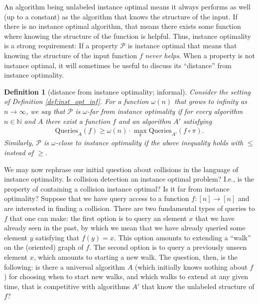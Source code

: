 \documentclass[11pt]{article}
\numberwithin{equation}{section}
\newtheorem{definition}[definition]{Definition}
\newcommand{\N}{\mathbb N}
\renewcommand{\P}{\mathcal{P}}
\newcommand{\1}{\mathbf{1}}
\begin{document}
An algorithm being unlabeled instance optimal means it always performs as well (up to a constant) as the algorithm that knows the structure of the input. If there is no instance optimal algorithm, that means there exists some function where knowing the structure of the function is helpful.
Thus, instance optimality is a strong requirement: If a property $\P$ is instance optimal that means that knowing the structure of the input function $f$ \emph{never helps}.
When a property is not instance optimal, it will sometimes be useful to discuss its ``distance'' from instance optimality.
\begin{definition}[distance from instance optimality; informal]
Consider the setting of Definition \ref{def:inst_opt_inf}.
For a function $\omega(n)$ that grows to infinity as $n \to \infty$, we say that $\P$ is $\omega$-far from instance optimality if for every algorithm $n \in \N$ and $A$ there exist a function $f$ and an algorithm $A'$ satisfying 
\begin{align*}
\text{Queries}_A(f) \ge \omega(n) \cdot \max_\pi \text{Queries}_{A'}(f \circ \pi).
\end{align*}
Similarly, $\mathcal{P}$ is $\omega$-close to instance optimality if the above inequality holds with $\leq$ instead of  $\geq$.
\end{definition}










We may now rephrase our initial question about collisions in the language of instance optimality. Is collision detection an instance optimal problem? I.e., is the property of containing a collision instance optimal? Is it far from instance optimality? Suppose that we have query access to a function $f \colon [n] \to [n]$ and are interested in finding a collision. There are two fundamental types of queries to $f$ that one can make: the first option is to query an element $x$ that we have already seen in the past, by which we mean that we have already queried some element $y$ satisfying that $f(y) = x$. This option amounts to extending a ``walk'' on the (oriented) graph of $f$. 
The second option is to query a previously unseen element $x$, which amounts to starting a new walk. The question, then, is the following: is there a universal algorithm $A$ (which initially knows nothing about $f$) for choosing when to start new walks, and which walks to extend at any given time, that is competitive with algorithms $A'$ that know the unlabeled structure of $f$?
\end{document}
